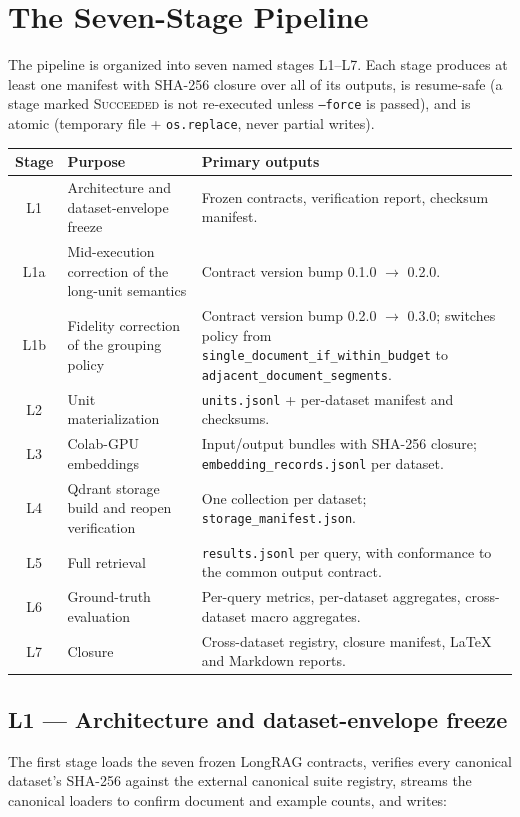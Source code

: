 \documentclass[11pt,a4paper]{article}
\begin{document}
\section{The Seven-Stage Pipeline}\label{sec:pipeline}

The pipeline is organized into seven named stages L1--L7. Each stage
produces at least one manifest with SHA-256 closure over all of its
outputs, is resume-safe (a stage marked \textsc{Succeeded} is not
re-executed unless \texttt{--force} is passed), and is atomic
(temporary file + \texttt{os.replace}, never partial writes).

\begin{center}
\begin{tabular}{c p{4.4cm} p{8cm}}
\toprule
\textbf{Stage} & \textbf{Purpose} & \textbf{Primary outputs} \\
\midrule
L1  & Architecture and dataset-envelope freeze &
  Frozen contracts, verification report, checksum manifest. \\
L1a & Mid-execution correction of the long-unit semantics &
  Contract version bump 0.1.0 $\to$ 0.2.0. \\
L1b & Fidelity correction of the grouping policy &
  Contract version bump 0.2.0 $\to$ 0.3.0; switches policy from
  \texttt{single\_document\_if\_within\_budget} to
  \texttt{adjacent\_document\_segments}. \\
L2  & Unit materialization &
  \texttt{units.jsonl} + per-dataset manifest and checksums. \\
L3  & Colab-GPU embeddings &
  Input/output bundles with SHA-256 closure; \texttt{embedding\_records.jsonl}
  per dataset. \\
L4  & Qdrant storage build and reopen verification &
  One collection per dataset; \texttt{storage\_manifest.json}. \\
L5  & Full retrieval &
  \texttt{results.jsonl} per query, with conformance to the common
  output contract. \\
L6  & Ground-truth evaluation &
  Per-query metrics, per-dataset aggregates, cross-dataset macro
  aggregates. \\
L7  & Closure &
  Cross-dataset registry, closure manifest, \LaTeX{} and Markdown
  reports. \\
\bottomrule
\end{tabular}
\end{center}

\subsection{L1 --- Architecture and dataset-envelope freeze}
The first stage loads the seven frozen LongRAG contracts, verifies
every canonical dataset's SHA-256 against the external canonical
suite registry, streams the canonical loaders to confirm document
and example counts, and writes:
\end{document}
